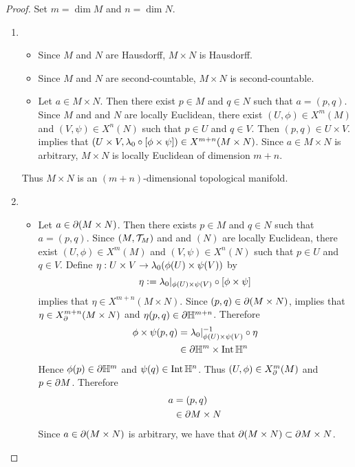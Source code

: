 \documentclass{book}
\begin{document}
\begin{proof}
	 Set $m = \dim M$ and $n = \dim N$. 
	 \begin{enumerate}
	 	\item 
	 	\begin{itemize}
	 		\item Since $M$ and $N$ are Hausdorff, $M \times N$ is Hausdorff.
	 		\item Since $M$ and $N$ are second-countable, $M \times N$ is second-countable.
	 		\item Let $a \in M \times N$. Then there exist $p \in M$ and $q \in N$ such that $a = (p,q)$. Since $M$ and and $N$ are locally Euclidean, there exist $(U, \phi) \in X^m(M)$ and $(V, \psi) \in X^n(N)$ such that $p \in U$ and $q \in V$. Then $(p,q) \in U \times V$.  implies that $(U \times V, \lambda_0 \circ [\phi \times \psi]) \in X^{m+n}(M \times N)$. Since $a \in M \times N$ is arbitrary, $M \times N$ is locally Euclidean of dimension $m+n$.   
	 	\end{itemize}
 		Thus $M \times N$ is an $(m+n)$-dimensional topological manifold.
	 	\item 
	 	\begin{itemize}
	 		\item Let $a \in \partial(M \times N)$. Then there exists $p \in M$ and $q \in N$ such that $a = (p,q)$. Since $(M, \mathcal{T}_M)$ and and $(N)$ are locally Euclidean, there exist $(U, \phi) \in X^m(M)$ and $(V, \psi) \in X^n(N)$ such that $p \in U$ and $q \in V$. Define $\eta: U \times V \rightarrow \lambda_0(\phi(U) \times \psi(V))$ by 
	 		$$\eta \vcentcolon= \lambda_0|_{\phi(U) \times \psi(V)} \circ [\phi \times \psi]$$ 
	 		 implies that $\eta \in X^{m+n}(M \times N)$. Since $(p, q) \in \partial (M \times N)$,  implies that $\eta \in X^{m+n}_{\partial}(M \times N)$ and $\eta(p,q) \in \partial \mathbb{H}^{m+n}$. Therefore 
	 		\begin{align*}
	 			\phi \times \psi(p,q)
	 			& = \lambda_0|_{\phi(U) \times \psi(V)}^{-1} \circ \eta \\
	 			& \in \partial \mathbb{H}^m \times \operatorname{Int} \mathbb{H}^n 
	 		\end{align*}
	 		Hence $\phi(p) \in \partial \mathbb{H}^m$ and $\psi(q) \in \operatorname{Int} \mathbb{H}^n$. Thus $(U, \phi) \in X^m_{\partial}(M)$ and $p \in \partial M$. Therefore  
	 		\begin{align*}
	 			a
	 			& = (p,q) \\
	 			& \in \partial M \times N
	 		\end{align*}
	 		Since $a \in \partial(M \times N)$ is arbitrary, we have that $\partial(M \times N) \subset \partial M \times N$.

\end{itemize}
\end{enumerate}
\end{proof}
\end{document}
